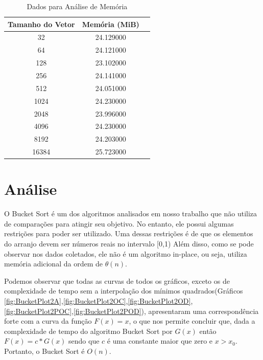 \documentclass[12pt,a4paper,twoside]{report}
\begin{document}
\begin{table}[h]
  \centering
  \caption{Dados para Análise de Memória \label{tab:memoria}}
  \begin{tabular}{ccc} \\\hline
  \textbf{Tamanho do Vetor} & \textbf{Memória (MiB)} \\\hline
  32                        & 24.129000                  \\\hline
  64                        & 24.121000            \\\hline
  128                       & 23.102000            \\\hline
  256                       & 24.141000            \\\hline
  512                       & 24.051000            \\\hline
  1024                       & 24.230000            \\\hline
  2048                       & 23.996000            \\\hline
  4096                       & 24.230000            \\\hline
  8192                       & 24.203000            \\\hline
  16384                       & 25.723000            \\\hline

  \end{tabular}
\end{table}



\chapter{Análise}

O Bucket Sort é um dos algoritmos analisados em nosso trabalho que não utiliza de comparações para atingir seu objetivo. No entanto, ele possui algumas restrições para poder ser utilizado. Uma dessas restrições é de que os elementos do arranjo devem ser números reais no intervalo [0,1) Além disso, como se pode observar nos dados coletados, ele não é um algoritmo in-place, ou seja, utiliza memória adicional da ordem de $\theta (n)$.

Podemos observar que todas as curvas de todos os gráficos, exceto os de complexidade de tempo sem a interpolação dos mínimos quadrados(Gráficos \ref{fig:BucketPlot2A},\ref{fig:BucketPlot2OC},\ref{fig:BucketPlot2OD},\ref{fig:BucketPlot2POC},\ref{fig:BucketPlot2POD}), apresentaram uma correspondência forte com a curva da função $F(x) = x$, o que nos permite concluir que, dada a complexidade de tempo do algoritmo Bucket Sort por $G(x)$ então $F(x) = c * G(x)$ sendo que $c$ é uma constante maior que zero e $x > x_0$. Portanto, o Bucket Sort é $O(n)$.
\end{document}
